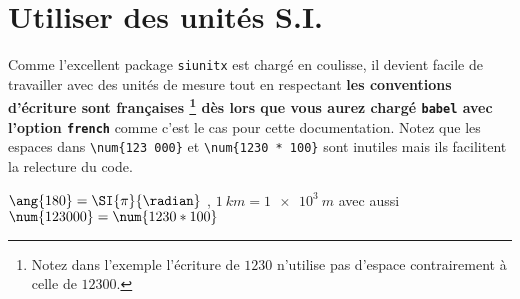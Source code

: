 \documentclass[12pt,a4paper]{article}
\begin{document}
\section{Utiliser des unités S.I.}

Comme l'excellent package \verb#siunitx# est chargé en coulisse, il devient facile de travailler avec des unités de mesure tout en respectant
\textbf{%
les conventions d'écriture sont françaises
	\footnote{
		Notez dans l'exemple l'écriture de $\num{1230}$ n'utilise pas d'espace contrairement à celle de $\num{12300}$.
	}
dès lors que vous aurez chargé \texttt{babel} avec l'option \texttt{french}%
} comme c'est le cas pour cette documentation.
Notez que les espaces dans \verb#\num{123 000}# et \verb#\num{1230 * 100}# sont inutiles mais ils facilitent la relecture du code.

\begin{latexex}
$\ang{180} = \SI{\pi}{\radian}$ ,
$\SI{1}{km} = \SI{1e3}{m}$ avec aussi
$\num{123 000} = \num{1230 * 100}$
\end{latexex}
\end{document}
